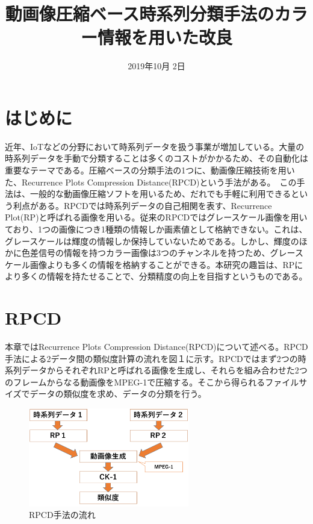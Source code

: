 \documentclass{cssotsuken}
\date{2019年10月 2日} %
\title{動画像圧縮ベース時系列分類手法のカラー情報を用いた改良}
\begin{document}
\maketitle
\fontsize{10pt}{17pt}\selectfont


\section{はじめに}
近年、IoTなどの分野において時系列データを扱う事業が増加している。大量の時系列データを手動で分類することは多くのコストがかかるため、その自動化は重要なテーマである。圧縮ベースの分類手法の1つに、動画像圧縮技術を用いた、Recurrence Plots Compression Distance(RPCD)という手法がある。\cite{RPCD}　この手法は、一般的な動画像圧縮ソフトを用いるため、だれでも手軽に利用できるという利点がある。RPCDでは時系列データの自己相関を表す、Recurrence Plot(RP)と呼ばれる画像を用いる。従来のRPCDではグレースケール画像を用いており、1つの画像につき1種類の情報しか画素値として格納できない。これは、グレースケールは輝度の情報しか保持していないためである。しかし、輝度のほかに色差信号の情報を持つカラー画像は3つのチャンネルを持つため、グレースケール画像よりも多くの情報を格納することができる。本研究の趣旨は、RPにより多くの情報を持たせることで、分類精度の向上を目指すというものである。


\section{RPCD}

本章ではRecurrence Plots Compression Distance(RPCD)について述べる。RPCD手法による2データ間の類似度計算の流れを図１に示す。RPCDではまず2つの時系列データからそれぞれRPと呼ばれる画像を生成し、それらを組み合わせた2つのフレームからなる動画像をMPEG-1で圧縮する。そこから得られるファイルサイズでデータの類似度を求め、データの分類を行う。

\begin{figure}[H]
	\centering
	\includegraphics[width=7cm]{RPCD.png}
	\caption{RPCD手法の流れ}
	\label{fig:RPCD}
\end{figure}
\end{document}
